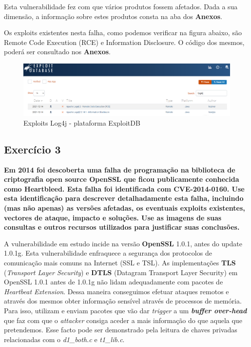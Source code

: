 \documentclass[11t]{article}
\begin{document}
\vspace{0.5cm}

Esta vulnerabilidade fez com que vários produtos fossem afetados. Dada a sua dimensão, a informação sobre estes produtos consta na aba dos \textbf{Anexos}.

\vspace{0.2cm}

Os exploits existentes nesta falha, como podemos verificar na figura abaixo, são Remote Code Execution (RCE) e Information Disclosure. O código dos mesmos, poderá ser consultado nos \textbf{Anexos}.

\begin{figure}[H]
    \centering
    \includegraphics[width=1\textwidth]{images/ExploitsLog4j.png}
    \caption{Exploits Log4j - plataforma ExploitDB}
\end{figure}
\vspace{3cm}



\clearpage
\subsection{Exercício 3}
\textbf{Em 2014 foi descoberta uma falha de programação na biblioteca de criptografia open source OpenSSL que ficou publicamente conhecida como Heartbleed. Esta falha foi identificada com CVE-2014-0160. Use esta identificação para descrever detalhadamente esta falha, incluindo (mas não apenas) as versões afetadas, os eventuais exploits existentes, vectores de ataque, impacto e soluções. Use as imagens de suas consultas e outros recursos utilizados para justificar suas conclusões.}

\vspace{0.5cm}

A vulnerabilidade em estudo incide na versão \textbf{OpenSSL} 1.0.1, antes do update 1.0.1g. Esta vulnerabilidade enfraquece a segurança dos protocolos de comunicação mais comuns na Internet (SSL e TSL). As implementações \textbf{TLS} (\textit{Transport Layer Security}) e \textbf{DTLS} (Datagram Transport Layer Security) em OpenSSL 1.0.1 antes de 1.0.1g não lidam adequadamente com pacotes de \textit{Heartbeat Extension}. Dessa maneira conseguimos efetuar ataques remotos e através dos mesmos obter informação sensível através de processos de memória. Para isso, utilizam e enviam pacotes que vão dar \textit{trigger} a um \textit{\textbf{buffer over-head}} que faz com que o \textit{attacker} consiga aceder a mais informação do que aquela que pretendemos. Esse facto pode ser demonstrado pela leitura de chaves privadas relacionadas com o \textit{d1\_both.c} e \textit{t1\_lib.c}.
\end{document}
